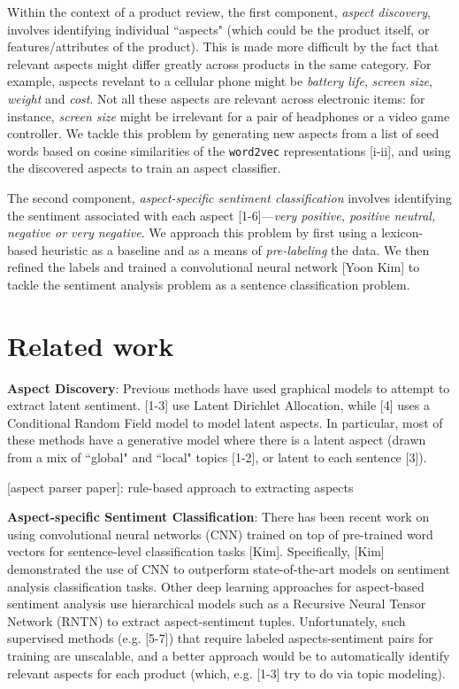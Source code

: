 \documentclass{article} %
\begin{document}
Within the context of a product review, the first component, \textit{aspect discovery}, involves identifying individual ``aspects" (which could be the product itself, or features/attributes of the product). This is made more difficult by the fact that relevant aspects might differ greatly across products in the same category. For example, aspects revelant to a cellular phone might be \textit{battery life}, \textit{screen size}, \textit{weight} and \textit{cost}. Not all these aspects are relevant across electronic items: for instance, \textit{screen size} might be irrelevant for a pair of headphones or a video game controller. We tackle this problem by generating new aspects from a list of seed words based on cosine similarities of the \texttt{word2vec} representations [i-ii], and using the discovered aspects to train an aspect classifier.

The second component, \textit{aspect-specific sentiment classification} involves identifying the sentiment associated with each aspect [1-6]---\textit{very positive, positive neutral, negative or very negative}. We approach this problem by first using a lexicon-based heuristic as a baseline and as a means of \textit{pre-labeling} the data. We then refined the labels and trained a convolutional neural network [Yoon Kim] to tackle the sentiment analysis problem as a sentence classification problem.

\section{Related work}


\textbf{Aspect Discovery}: Previous methods have used graphical models to attempt to extract latent sentiment. [1-3] use Latent Dirichlet Allocation, while [4] uses a Conditional Random Field model to model latent aspects. In particular, most of these methods have a generative model where there is a latent aspect (drawn from a mix of ``global" and ``local" topics [1-2], or latent to each sentence [3]). 


[aspect parser paper]: rule-based approach to extracting aspects

\textbf{Aspect-specific Sentiment Classification}: There has been recent work on using convolutional neural networks (CNN) trained on top of pre-trained word vectors for sentence-level classification tasks [Kim]. Specifically, [Kim] demonstrated the use of CNN to outperform state-of-the-art models on sentiment analysis classification tasks. Other deep learning approaches for aspect-based sentiment analysis use hierarchical models such as a Recursive Neural Tensor Network (RNTN) to extract aspect-sentiment tuples. Unfortunately, such supervised methods (e.g. [5-7]) that require labeled aspects-sentiment pairs for training are unscalable, and a better approach would be to automatically identify relevant aspects for each product (which, e.g. [1-3] try to do via topic modeling). 
\end{document}
